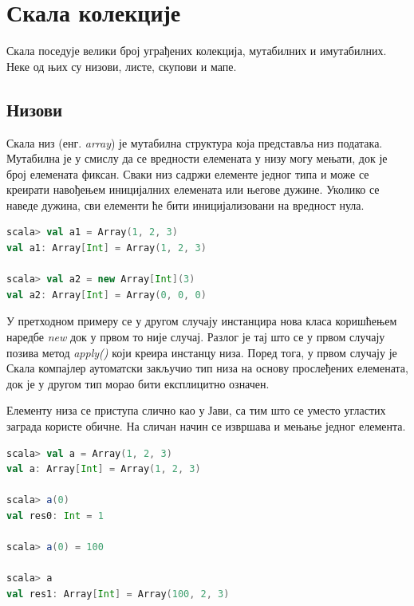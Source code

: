 \documentclass[12pt,oneside]{memoir}
\begin{document}
\section{Скала колекције}
\label{sec:scala_coll}

Скала поседује велики број уграђених колекција, мутабилних и имутабилних. Неке од њих су низови, листе, скупови и мапе.

\subsection{Низови}
\label{subsec:scala_arrays}

Скала низ (енг. \textit{array}) је мутабилна структура која представља низ података. Мутабилна је у смислу да се вредности елемената у низу могу мењати, док је број елемената фиксан. Сваки низ садржи елементе једног типа и може се креирати навођењем иницијалних елемената или његове дужине. Уколико се наведе дужина, сви елементи ће бити иницијализовани на вредност нула. \cite{scala_prog}

\begin{lstlisting}[language=Scala, caption={Инстанцирање низа у Скали}, label={lst:scala_coll_array_example}]
scala> val a1 = Array(1, 2, 3)
val a1: Array[Int] = Array(1, 2, 3)

scala> val a2 = new Array[Int](3)
val a2: Array[Int] = Array(0, 0, 0)
\end{lstlisting}

У претходном примеру се у другом случају инстанцира нова класа коришћењем наредбе \textit{new} док у првом то није случај. Разлог је тај што се у првом случају позива метод \textit{apply()} који креира инстанцу низа. Поред тога, у првом случају је Скала компајлер аутоматски закључио тип низа на основу прослеђених елемената, док је у другом тип морао бити експлицитно означен. \cite{scala_prog}

Елементу низа се приступа слично као у Јави, са тим што се уместо угластих заграда користе обичне. На сличан начин се извршава и мењање једног елемента.

\begin{lstlisting}[language=Scala, caption={Приступ и измена елемента}, label={lst:scala_coll_array_get_set}]
scala> val a = Array(1, 2, 3)
val a: Array[Int] = Array(1, 2, 3)

scala> a(0)
val res0: Int = 1

scala> a(0) = 100

scala> a
val res1: Array[Int] = Array(100, 2, 3)
\end{lstlisting}
\end{document}
